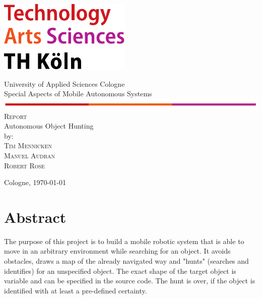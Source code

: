 \documentclass[a4paper,12pt,oneside]{article}
\renewcommand{\headrulewidth}{0pt}
\renewcommand{\footrulewidth}{0pt}}
\begin{document}
\pagestyle{empty}
\begin{titlepage}
	\includegraphics[scale=1.00]{sources/logo_TH-Koeln_CMYK_22pt-eps-converted-to.pdf}\\
	\begin{center}
		\large
		University of Applied Sciences Cologne\\
		Special Aspects of Mobile Autonomous Systems\\
		\includegraphics[scale=1.0]{sources/TH.PNG}\\
		\vspace{1cm}
		\textsc{Report}\\
		\vspace{2cm} %
		\LARGE
		Autonomous Object Hunting\\
		\vspace{3cm}
		\large
		\vspace{1.0cm}
		by:\\
		\textsc{Tim Mennicken}\\
		\textsc{Manuel Audran}\\
		\textsc{Robert Rose}
		\vspace{1cm}

		\vspace{5cm}
		Cologne, \today
	\end{center}    
\end{titlepage}

\newpage

\thispagestyle{fancy}
\fancyhead{}
\fancyhf{}
\renewcommand{\headrulewidth}{0pt}
\renewcommand{\footrulewidth}{0.4pt}
\fancyfoot[R] {}

\section*{Abstract}

The purpose of this project is to build a mobile robotic system that is able to move in an arbitrary environment while searching for an object. It avoids obstacles, draws a map of the already navigated way and "hunts" (searches and identifies) for an unspecified object. The exact shape of the target object is variable and can be specified in the source code. The hunt is over, if the object is identified with at least a pre-defined certainty.\\
\end{document}
